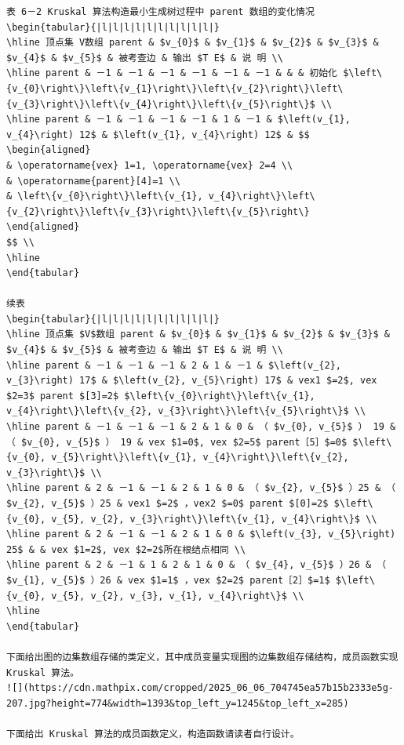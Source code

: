 \documentclass[10pt]{article}
\begin{document}
\begin{verbatim}
表 6－2 Kruskal 算法构造最小生成树过程中 parent 数组的变化情况
\begin{tabular}{|l|l|l|l|l|l|l|l|l|l|}
\hline 顶点集 V数组 parent & $v_{0}$ & $v_{1}$ & $v_{2}$ & $v_{3}$ & $v_{4}$ & $v_{5}$ & 被考查边 & 输出 $T E$ & 说 明 \\
\hline parent & －1 & －1 & －1 & －1 & －1 & －1 & & & 初始化 $\left\{v_{0}\right\}\left\{v_{1}\right\}\left\{v_{2}\right\}\left\{v_{3}\right\}\left\{v_{4}\right\}\left\{v_{5}\right\}$ \\
\hline parent & －1 & －1 & －1 & －1 & 1 & －1 & $\left(v_{1}, v_{4}\right) 12$ & $\left(v_{1}, v_{4}\right) 12$ & $$
\begin{aligned}
& \operatorname{vex} 1=1, \operatorname{vex} 2=4 \\
& \operatorname{parent}[4]=1 \\
& \left\{v_{0}\right\}\left\{v_{1}, v_{4}\right\}\left\{v_{2}\right\}\left\{v_{3}\right\}\left\{v_{5}\right\}
\end{aligned}
$$ \\
\hline
\end{tabular}

续表
\begin{tabular}{|l|l|l|l|l|l|l|l|l|l|}
\hline 顶点集 $V$数组 parent & $v_{0}$ & $v_{1}$ & $v_{2}$ & $v_{3}$ & $v_{4}$ & $v_{5}$ & 被考查边 & 输出 $T E$ & 说 明 \\
\hline parent & －1 & －1 & －1 & 2 & 1 & －1 & $\left(v_{2}, v_{3}\right) 17$ & $\left(v_{2}, v_{5}\right) 17$ & vex1 $=2$, vex $2=3$ parent $[3]=2$ $\left\{v_{0}\right\}\left\{v_{1}, v_{4}\right\}\left\{v_{2}, v_{3}\right\}\left\{v_{5}\right\}$ \\
\hline parent & －1 & －1 & －1 & 2 & 1 & 0 & （ $v_{0}, v_{5}$ ） 19 & （ $v_{0}, v_{5}$ ） 19 & vex $1=0$, vex $2=5$ parent［5］$=0$ $\left\{v_{0}, v_{5}\right\}\left\{v_{1}, v_{4}\right\}\left\{v_{2}, v_{3}\right\}$ \\
\hline parent & 2 & －1 & －1 & 2 & 1 & 0 & （ $v_{2}, v_{5}$ ）25 & （ $v_{2}, v_{5}$ ）25 & vex1 $=2$ ，vex2 $=0$ parent $[0]=2$ $\left\{v_{0}, v_{5}, v_{2}, v_{3}\right\}\left\{v_{1}, v_{4}\right\}$ \\
\hline parent & 2 & －1 & －1 & 2 & 1 & 0 & $\left(v_{3}, v_{5}\right) 25$ & & vex $1=2$, vex $2=2$所在根结点相同 \\
\hline parent & 2 & －1 & 1 & 2 & 1 & 0 & （ $v_{4}, v_{5}$ ）26 & （ $v_{1}, v_{5}$ ）26 & vex $1=1$ ，vex $2=2$ parent［2］$=1$ $\left\{v_{0}, v_{5}, v_{2}, v_{3}, v_{1}, v_{4}\right\}$ \\
\hline
\end{tabular}

下面给出图的边集数组存储的类定义，其中成员变量实现图的边集数组存储结构，成员函数实现 Kruskal 算法。
![](https://cdn.mathpix.com/cropped/2025_06_06_704745ea57b15b2333e5g-207.jpg?height=774&width=1393&top_left_y=1245&top_left_x=285)

下面给出 Kruskal 算法的成员函数定义，构造函数请读者自行设计。
\end{verbatim}
\end{document}
